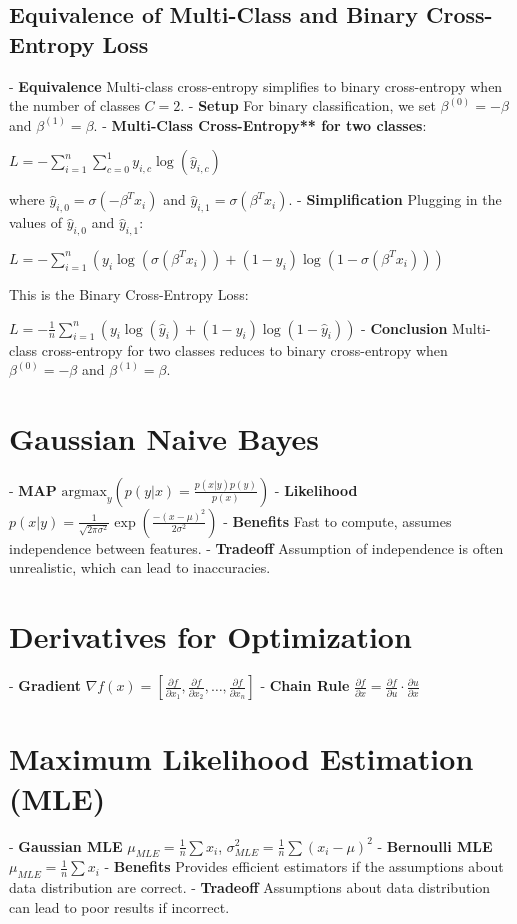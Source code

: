 \documentclass[10pt]{article}
\begin{document}
\begin{multicols}{2}
\subsection*{Equivalence of Multi-Class and Binary Cross-Entropy Loss}
- \textbf{Equivalence} Multi-class cross-entropy simplifies to binary cross-entropy when the number of classes $C = 2$.
- \textbf{Setup} For binary classification, we set $\beta^{(0)} = -\beta$ and $\beta^{(1)} = \beta$.
- \textbf{Multi-Class Cross-Entropy** for two classes}:
  
  $L = -\sum_{i=1}^{n} \sum_{c=0}^{1} y_{i,c} \log(\hat{y}_{i,c})$
  
  where $\hat{y}_{i,0} = \sigma(-\beta^T x_i)$ and $\hat{y}_{i,1} = \sigma(\beta^T x_i)$.
- \textbf{Simplification} Plugging in the values of $\hat{y}_{i,0}$ and $\hat{y}_{i,1}$:
  
  $L = -\sum_{i=1}^{n} \left( y_i \log(\sigma(\beta^T x_i)) + (1 - y_i) \log(1 - \sigma(\beta^T x_i)) \right)$
  
 This is the Binary Cross-Entropy Loss:
  
  $L = -\frac{1}{n} \sum_{i=1}^{n} \left( y_i \log(\hat{y}_i) + (1 - y_i) \log(1 - \hat{y}_i) \right)$
- \textbf{Conclusion} Multi-class cross-entropy for two classes reduces to binary cross-entropy when $\beta^{(0)} = -\beta$ and $\beta^{(1)} = \beta$.


\section*{Gaussian Naive Bayes}
- \textbf{MAP} $\text{argmax}_y \left( p(y|x) = \frac{p(x|y)p(y)}{p(x)} \right)$
- \textbf{Likelihood} $p(x|y) = \frac{1}{\sqrt{2\pi\sigma^2}} \exp\left(\frac{-(x-\mu)^2}{2\sigma^2}\right)$
- \textbf{Benefits} Fast to compute, assumes independence between features.
- \textbf{Tradeoff} Assumption of independence is often unrealistic, which can lead to inaccuracies.

\section*{Derivatives for Optimization}
- \textbf{Gradient} $\nabla f(x) = \left[\frac{\partial f}{\partial x_1}, \frac{\partial f}{\partial x_2}, \dots, \frac{\partial f}{\partial x_n}\right]$
- \textbf{Chain Rule} $\frac{\partial f}{\partial x} = \frac{\partial f}{\partial u} \cdot \frac{\partial u}{\partial x}$

\section*{Maximum Likelihood Estimation (MLE)}
- \textbf{Gaussian MLE} $\mu_{MLE} = \frac{1}{n} \sum x_i$, \quad $\sigma_{MLE}^2 = \frac{1}{n} \sum (x_i - \mu)^2$
- \textbf{Bernoulli MLE} $\mu_{MLE} = \frac{1}{n} \sum x_i$
- \textbf{Benefits} Provides efficient estimators if the assumptions about data distribution are correct.
- \textbf{Tradeoff} Assumptions about data distribution can lead to poor results if incorrect.


\end{multicols}
\end{document}
